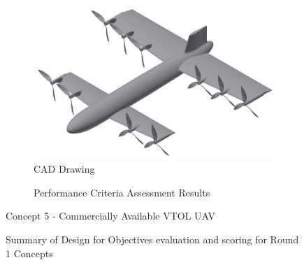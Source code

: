 \begin{figure}[H]
\centering
\begin{subfigure}[t]{.5\textwidth}
  \centering
  \includegraphics[width=0.95\linewidth]{Concepts/CAD/Round2_3_cad.jpg}
  \caption{CAD Drawing}
  \label{fig:cad1}
\end{subfigure}%
\begin{subfigure}[t]{.5\textwidth}
  \centering
  \caption{Performance Criteria Assessment Results}
  \label{fig:radar1}
\end{subfigure}
\caption{Concept 5 - Commercially Available VTOL UAV}
\label{fig:concept2}
\end{figure}

\begin{figure}[H]
    \centering
    \caption{Summary of Design for Objectives evaluation and scoring for Round 1 Concepts}
    \label{fig:summary}
\end{figure}


